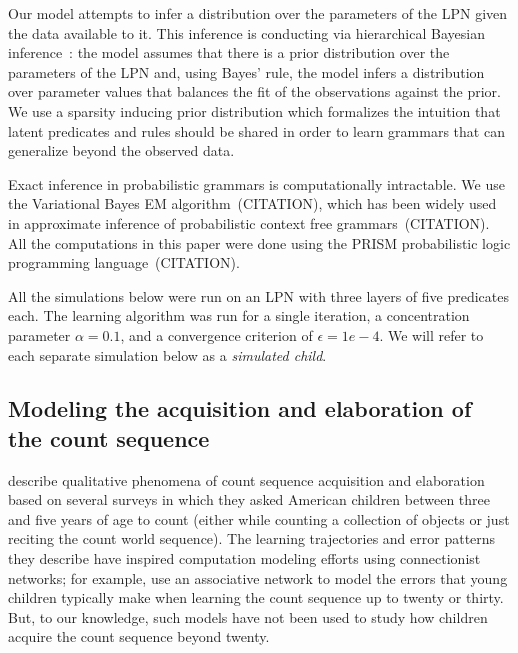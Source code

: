 \documentclass[10pt,letterpaper]{article}
\begin{document}
Our model attempts to infer a distribution over the parameters of the
LPN given the data available to it. This inference is conducting via
hierarchical Bayesian inference~\citep{gelman2014bayesian}: the model
assumes that there is a prior distribution over the parameters of the
LPN and, using Bayes' rule, the model infers a distribution
over parameter values that balances the fit of the observations
against the prior. We use a sparsity inducing prior distribution which
formalizes the intuition that latent predicates and rules should be
shared in order to learn grammars that can generalize beyond the
observed data.

Exact inference in probabilistic grammars is computationally
intractable. We use the Variational Bayes EM algorithm~(CITATION), which has
been widely used in approximate inference of probabilistic context
free grammars~(CITATION). All the computations in this paper were done
using the PRISM probabilistic logic programming language~(CITATION).

All the simulations below were run on an LPN with three layers of five
predicates each. The learning algorithm was run for a single
iteration, a concentration parameter $\alpha=0.1$, and a convergence
criterion of $\epsilon=1e-4$. We will refer to each separate
simulation below as a \emph{simulated child}.

\subsection{Modeling the acquisition and elaboration of the count sequence}

\citet{FusRicBriar1982} describe qualitative phenomena of
count sequence acquisition and elaboration based on several surveys in
which they asked American children between three and five years of age
to count (either while counting a collection of objects or just
reciting the count world sequence). The learning trajectories and
error patterns they describe have inspired computation modeling
efforts using connectionist networks; for example,
\citet{ma1989modeling} use an associative network to model the errors
that young children typically make when learning the count sequence up
to twenty or thirty. But, to our knowledge, such models have not been
used to study how children acquire the count sequence beyond twenty.
\end{document}
